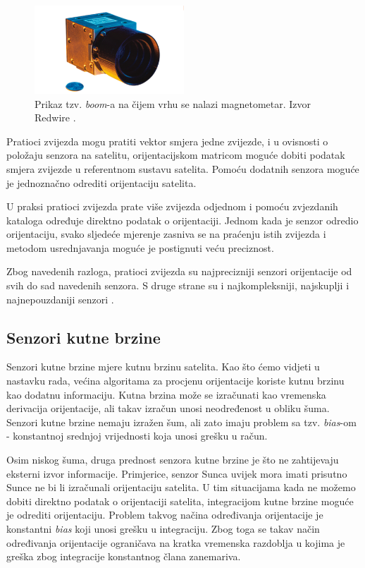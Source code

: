 \documentclass[times, utf8, diplomski, numeric]{templates/template}
\begin{document}
{{{{                \begin{figure}[htb]
                \centering
                \includegraphics[width=0.5\textwidth]{images/star_tracker.png}
                \caption{Prikaz tzv. \emph{boom}-a na čijem vrhu se nalazi magnetometar. Izvor Redwire \cite{starTrackerCite}.}
                \label{fig:star_tracker}
                \end{figure}

                Pratioci zvijezda mogu pratiti vektor smjera jedne zvijezde, i u ovisnosti o položaju senzora na satelitu, orijentacijskom matricom moguće dobiti podatak smjera zvijezde u referentnom sustavu satelita. Pomoću dodatnih senzora moguće je jednoznačno odrediti orijentaciju satelita. 

                U praksi pratioci zvijezda prate više zvijezda odjednom i pomoću zvjezdanih kataloga \cite{starCatalogs} određuje direktno podatak o orijentaciji. Jednom kada je senzor odredio orijentaciju, svako sljedeće mjerenje zasniva se na praćenju istih zvijezda i metodom usrednjavanja moguće je postignuti veću preciznost. 

                Zbog navedenih razloga, pratioci zvijezda su najprecizniji senzori orijentacije od svih do sad navedenih senzora. S druge strane su i najkompleksniji, najskuplji i najnepouzdaniji senzori \cite{adcsKnjiga}. 
            }
        }

        \subsection{Senzori kutne brzine}{
            Senzori kutne brzine mjere kutnu brzinu satelita. Kao što ćemo vidjeti u nastavku rada, većina algoritama za procjenu orijentacije koriste kutnu brzinu kao dodatnu informaciju. Kutna brzina može se izračunati kao vremenska derivacija orijentacije, ali takav izračun unosi neodređenost u obliku šuma. Senzori kutne brzine nemaju izražen šum, ali zato imaju problem sa tzv. \emph{bias}-om - konstantnoj srednjoj vrijednosti koja unosi grešku u račun. 

            Osim niskog šuma, druga prednost senzora kutne brzine je što ne zahtijevaju eksterni izvor informacije. Primjerice, senzor Sunca uvijek mora imati prisutno Sunce ne bi li izračunali orijentaciju satelita. U tim situacijama kada ne možemo dobiti direktno podatak o orijentaciji satelita, integracijom kutne brzine moguće je odrediti orijentaciju. Problem takvog načina određivanja orijentacije je konstantni \emph{bias} koji unosi grešku u integraciju. Zbog toga se takav način određivanja orijentacije ograničava na kratka vremenska razdoblja u kojima je greška zbog integracije konstantnog člana zanemariva.

}}}
\end{document}
